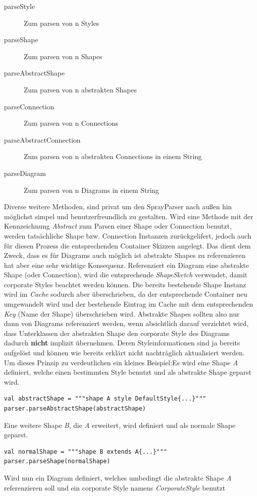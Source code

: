 \begin{description}
\item[parseStyle] Zum parsen von n Styles
\item[parseShape] Zum parsen von n Shapes
\item[parseAbstractShape] Zum parsen von n abstrakten Shapes
\item[parseConnection] Zum parsen von n Connections
\item[parseAbstractConnection] Zum parsen von n abstrakten Connections in einem String
\item[parseDiagram] Zum parsen von n Diagrams in einem String
\end{description}
Diverse weitere Methoden, sind privat um den SprayParser nach außen hin möglichst simpel und benutzerfreundlich zu gestalten.
Wird eine Methode mit der Kennzeichnung \textit{Abstract} zum Parsen einer Shape oder Connection benutzt, werden tatsächliche Shape bzw. Connection Instanzen zurückgelifert, jedoch auch für diesen Prozess die entsprechenden Container Skizzen angelegt. Das dient dem Zweck, dass es für Diagrams auch möglich ist abstrakte Shapes zu referenzieren hat aber eine sehr wichtige Konsequenz. Referenziert ein Diagram eine abstrakte Shape (oder Connection), wird die entsprechende \textit{ShapeSketch} verwendet, damit corporate Styles beachtet werden können. Die bereits bestehende Shape Instanz wird im \textit{Cache} sodurch aber überschrieben, da der entsprechende Container neu umgewandelt wird und der bestehende Eintrag im Cache mit dem entsprechenden \textit{Key} (Name der Shape) überschrieben wird. Abstrakte Shapes sollten also nur dann von Diagrams referenziert werden, wenn absichtlich darauf verzichtet wird, dass Unterklassen der abstrakten Shape den corporate Style des Diagrams dadurch \textbf{nicht} implizit übernehmen. Deren Styleinformationen sind ja bereits aufgelöst und können wie bereits erklärt nicht nachträglich aktualisiert werden.
Um dieses Prinzip zu verdeutlichen ein kleines Beispiel:\linebreak Es wird eine Shape \textit{A} definiert, welche einen bestimmten Style benutzt und als abstrakte Shape geparst wird.
\begin{lstlisting}[style = scala, aboveskip=0pt]
val abstractShape = """shape A style DefaultStyle{...}"""
parser.parseAbstractShape(abstractShape)
\end{lstlisting}Eine weitere Shape \textit{B}, die \textit{A} erweitert, wird definiert und als normale Shape geparst.
\begin{lstlisting}[style = scala, aboveskip=0pt]
val normalShape = """shape B extends A{...}"""
parser.parseShape(normalShape)
\end{lstlisting}Wird nun ein Diagram definiert, welches umbedingt die abstrakte Shape \textit{A} referenzieren soll und ein corporate Style namens \textit{CorporateStyle} benutzt
